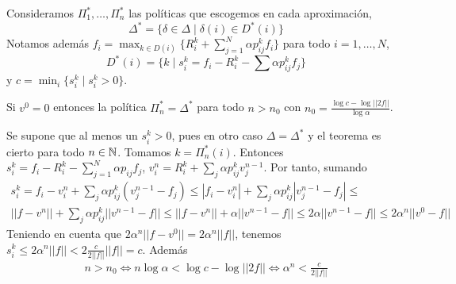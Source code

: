 \documentclass[MIOP.tex]{subfiles}
\begin{document}
Consideramos $\Pi_1^*, \dotsc, \Pi^*_n$ las políticas que escogemos en cada aproximación, $$\Delta^* = \{\delta \in \Delta \mid \delta(i)\in D^*(i)\}$$
Notamos además $f_i = \max_{k\in D(i)} \{R_i^k + \sum_{j=1}^N\alpha p_{ij}^k f_i\}$ para todo $i=1,\dotsc, N$,
$$ D^*(i)=\{ k\mid s_i^k = f_i - R_i^k - \sum \alpha p_{ij}^kf_j\}$$
y $c=\min_i \{s_i^k \mid s_i^k >0\}$.
\begin{teorema}
Si $v^0 =0$ entonces la política $\Pi_n^* = \Delta^*$ para todo $n>n_0$ con $n_0 = \frac{\log c - \log ||2f||}{\log \alpha}$.
\end{teorema}
\begin{dem}
Se supone que al menos un $s_i^k>0$, pues en otro caso $\Delta = \Delta^*$ y el teorema es cierto para todo $n\in\mathbb{N}$. Tomamos $k=\Pi^*_n(i)$. Entonces $s_i^k = f_i - R^k_i - \sum_{j=1}^N \alpha p_{ij}f_j$, $v_i^n = R^k_i + \sum_j \alpha p_{ij}^kv_j^{n-1}$. Por tanto, sumando
\begin{gather*}
s_i^k = f_i-v_i^n + \sum_j \alpha p_{ij}^k(v_j^{n-1}-f_j) \leq |f_i - v_i^n|+\sum_j \alpha p_{ij}^k|v_j^{n-1}-f_j| \leq \\
||f-v^n|| + \sum_j \alpha p_{ij}^k
||v^{n-1}-f|| \leq ||f-v^n|| + \alpha ||v^{n-1}-f||  \leq 2 \alpha ||v^{n-1}-f|| \leq 2\alpha^n ||v^0-f||
\end{gather*}
Teniendo en cuenta que $2\alpha^n ||f-v^0|| = 2\alpha^n ||f||$, tenemos $s_i^k \leq 2\alpha^n ||f||<2\frac{c}{2||f||}||f|| = c$. Además
\begin{gather*}
n > n_0 \Leftrightarrow n\log \alpha <\log c - \log ||2f|| \Leftrightarrow \alpha^n < \frac{c}{2||f||}
\end{gather*}

\end{dem}
\end{document}
